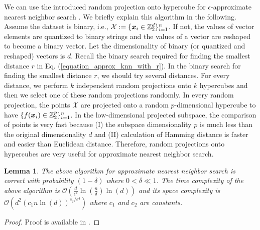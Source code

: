 \documentclass{article}
\newtheorem{lemma}{Lemma}
\def\b{\ensuremath\boldsymbol}
\begin{document}
We can use the introduced random projection onto hypercube for $\epsilon$-approximate nearest neighbor search \cite{kushilevitz1998algorithm,kushilevitz2000efficient}. 
We briefly explain this algorithm in the following. 
Assume the dataset is binary, i.e., $\mathcal{X} := \{\b{x}_i \in \mathbb{Z}_2^d\}_{i=1}^n$. If not, the values of vector elements are quantized to binary strings and the values of a vector are reshaped to become a binary vector. 
Let the dimensionality of binary (or quantized and reshaped) vectors is $d$. 
Recall the binary search required for finding the smallest distance $r$ in Eq. (\ref{equation_approx_knn_with_r}). 
In the binary search for finding the smallest distance $r$, we should try several distances. For every distance, we perform $k$ independent random projections onto $k$ hypercubes and then we select one of these random projections randomly. In every random projection, the points $\mathcal{X}$ are projected onto a random $p$-dimensional hypercube to have $\{f(\b{x}_i) \in \mathbb{Z}_2^p\}_{i=1}^n$. 
In the low-dimensional projected subspace, the comparison of points is very fast because (I) the subspace dimensionality $p$ is much less than the original dimensionality $d$ and (II) calculation of Hamming distance is faster and easier than Euclidean distance. Therefore, random projections onto hypercubes are very useful for approximate nearest neighbor search. 

\begin{lemma}
The above algorithm for approximate nearest neighbor search is correct with probability $(1 - \delta)$ where $0< \delta \ll 1$. 
The time complexity of the above algorithm is $\mathcal{O}(\frac{d}{\epsilon^4} \ln(\frac{n}{\delta}) \ln(d))$ and its space complexity is $\mathcal{O}(d^2 (c_1 n \ln(d))^{c_2 / \epsilon^4})$ where $c_1$ and $c_2$ are constants. 
\end{lemma}
\begin{proof}
Proof is available in \cite{kushilevitz1998algorithm,kushilevitz2000efficient,vempala2005random,liberty2006random}.
\end{proof}

\end{document}
